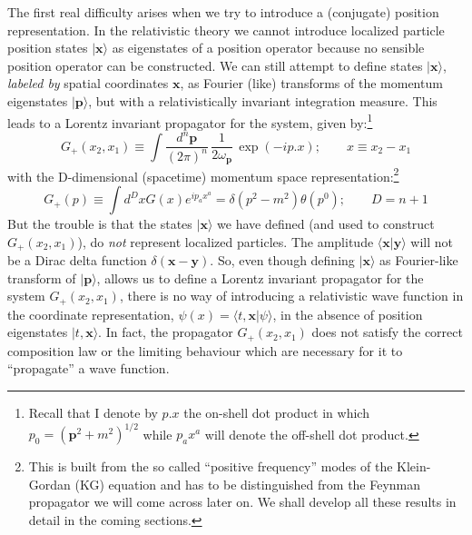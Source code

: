 \documentclass{article}
\def\ket#1{|#1\rangle}                    %
\def\amp#1#2{\langle #1 | #2\rangle}      %
\begin{document}
  The first real difficulty arises when we try to introduce a (conjugate) position representation. In the relativistic theory we cannot introduce localized particle position states $\ket{\bm{x}}$ as eigenstates of a position operator because no sensible position operator can be constructed. We can still attempt to define states $\ket{\bm{x}}$, \textit{labeled by} spatial coordinates $\bm{x}$, as Fourier (like) transforms of the momentum eigenstates  $\ket{\bm{p}}$, but with a relativistically invariant integration measure. This leads to a Lorentz invariant propagator for the system, given by:\footnote{Recall that I denote by $p.x$ the on-shell dot product in which $p_0=(\bm{p}^2+m^2)^{1/2}$ while $p_ax^a$ will denote the off-shell dot product.} 
 \begin{equation}
G_+(x_2,x_1)\equiv \int  \frac{d^n\bm{p}}{(2\pi)^n}\,\frac{1}{2\omega_{\bm{p}}} \, \exp(- i p.x); \qquad x\equiv x_2-x_1  
\end{equation} 
with the D-dimensional (spacetime) momentum space representation:\footnote{This is built from the so called ``positive frequency'' modes of the Klein-Gordan (KG) equation and has to be distinguished from the Feynman propagator we will come across later on. We shall develop all these results in detail in the coming sections.}
\begin{equation}
 G_+(p)\equiv \int d^Dx G(x)e^{ip_ax^a}=\delta(p^2-m^2)\theta(p^0); \qquad D=n+1
\end{equation} 
 But the trouble is that the  states $\ket{\bm{x}}$ we have defined (and used to construct $G_+(x_2,x_1)$), do \textit{not} represent localized particles. The amplitude $\amp{\bm{x}}
  {\bm{y}}$ will not be a Dirac delta function $\delta(\bm{x}-\bm{y})$. So, even though defining $\ket{\bm{x}}$ as Fourier-like transform of  $\ket{\bm{p}}$, allows us to define a Lorentz invariant propagator for the system $G_+(x_2,x_1)$,  there is no way of introducing a relativistic wave function 
  in the coordinate representation,
  $\psi(x)=\amp{t,\bm{x}}{\psi}$, in the absence of position eigenstates $\ket{t,\bm{x}}$. In fact, the propagator  $G_+(x_2,x_1)$ does not satisfy the correct composition law or the limiting behaviour which are necessary for it  to ``propagate'' a wave function. 
 
\end{document}
